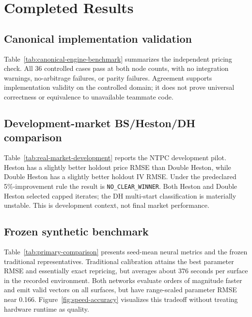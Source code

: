 \section{Completed Results}
\label{sec:completed-results}

\subsection{Canonical implementation validation}
Table~\ref{tab:canonical-engine-benchmark} summarizes the independent pricing check.
All 36 controlled cases pass at both node counts, with no integration warnings,
no-arbitrage failures, or parity failures. Agreement supports implementation validity
on the controlled domain; it does not prove universal correctness or equivalence to
unavailable teammate code.



\subsection{Development-market BS/Heston/DH comparison}
Table~\ref{tab:real-market-development} reports the NTPC development pilot. Heston has
a slightly better holdout price RMSE than Double Heston, while Double Heston has a
slightly better holdout IV RMSE. Under the predeclared 5\%-improvement rule the result
is \texttt{NO\_CLEAR\_WINNER}. Both Heston and Double Heston selected capped iterates;
the DH multi-start classification is materially unstable. This is development context,
not final market performance.



\subsection{Frozen synthetic benchmark}
Table~\ref{tab:primary-comparison} presents seed-mean neural metrics and the frozen
traditional representatives. Traditional calibration attains the best parameter RMSE
and essentially exact repricing, but averages about 376 seconds per surface in the
recorded environment. Both networks evaluate orders of magnitude faster and emit valid
vectors on all surfaces, but have range-scaled parameter RMSE near 0.166.
Figure~\ref{fig:speed-accuracy} visualizes this tradeoff without treating hardware
runtime as quality.



